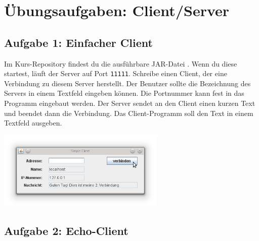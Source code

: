 \clearpage

\rehead[]{\textcolor{lightblue}{AvHG, Inf, My}}
\lohead[]{\textcolor{lightblue}{AvHG, Inf, My}}

\section{Übungsaufgaben: Client/Server}

\subsection{Aufgabe 1: Einfacher Client}

Im Kurs-Repository findest du die ausführbare JAR-Datei
. Wenn du diese startest, läuft der Server auf Port
\lstinline|11111|. Schreibe einen Client, der eine Verbindung zu diesem Server
herstellt. Der Benutzer sollte die Bezeichnung des Servers in einem Textfeld
eingeben können. Die Portnummer kann fest in das Programm eingebaut werden. Der
Server sendet an den Client einen kurzen Text und beendet dann die Verbindung.
Das Client-Programm soll den Text in einem Textfeld ausgeben.

\begin{center}
\includegraphics[width=0.6\textwidth]{./inf/SEKII/43_Java_ClientServer/SimpleClient.png}
\end{center}

\subsection{Aufgabe 2: Echo-Client}

